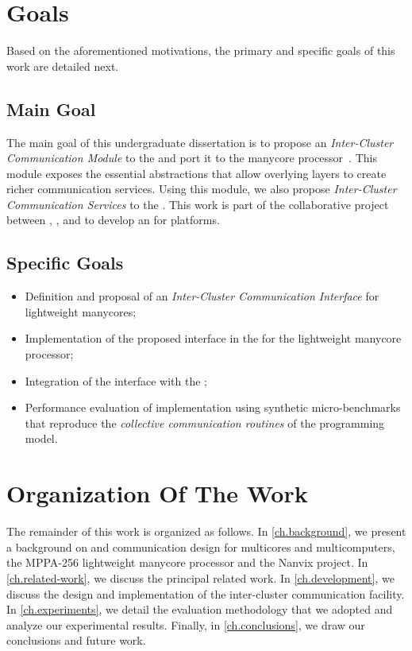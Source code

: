 \section{Goals}
\label{sec.goals}

	Based on the aforementioned motivations, the primary and specific
	goals of this work are detailed next.

\subsection{Main Goal}
\label{sec.goals.main}

	The main goal of this undergraduate dissertation is to propose an
	\textit{Inter-Cluster Communication Module} to the \textit{\nanvixhal}
	and port it to the \mppa manycore processor~\cite{DeDinechin2013-1}.
	This module exposes the essential abstractions that allow overlying
	layers to create richer communication services. Using this module, we
	also propose \textit{Inter-Cluster Communication Services} to the
	\textit{\nanvixmicrokernel}. This work is part of the collaborative
	project between \ufsc, \pucminas, and \uga to develop an \os for
	\lightweight \manycore platforms.

\subsection{Specific Goals}
\label{sec.goals.specific}

	\begin{itemize}
		\item Definition and proposal of an \textit{Inter-Cluster Communication Interface} for lightweight manycores;

		\item Implementation of the proposed interface in the \textit{\nanvixhal} for the \mppa lightweight manycore processor;
        
		\item Integration of the \nanvixhal interface with the \textit{\nanvixmicrokernel};
		
		\item Performance evaluation of \nanvixmicrokernel implementation using synthetic micro-benchmarks that reproduce the \textit{collective communication routines} of the \mpi programming model.
	\end{itemize}

\section{Organization Of The Work}
\label{sec.organization}

	The remainder of this work is organized as follows.
	In \autoref{ch.background}, we present a background on \os and communication
	design for multicores and multicomputers, the MPPA-256 lightweight manycore
	processor and the Nanvix project.
	In \autoref{ch.related-work}, we discuss the principal related work.
	In \autoref{ch.development}, we discuss the design and implementation
	of the inter-cluster communication facility.
	In \autoref{ch.experiments}, we detail the evaluation methodology
	that we adopted and analyze our experimental results.
	Finally, in \autoref{ch.conclusions}, we draw our conclusions and future work.
